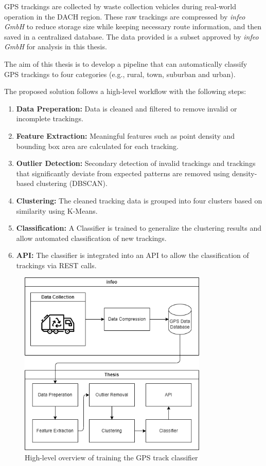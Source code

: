 \documentclass[a4paper,12pt,twoside]{scrreprt}
\begin{document}
GPS trackings are collected by waste collection vehicles during real-world
operation in the DACH region.
These raw trackings are compressed by \textit{infeo GmbH} to reduce storage
size while
keeping necessary route information, and then saved in a centralized database.
The data provided is a subset approved by \textit{infeo GmbH} for analysis in
this thesis.

The aim of this thesis is to develop a pipeline that can automatically classify
GPS trackings to four categories (e.g., rural, town, suburban and urban).

The proposed solution follows a high-level workflow with the following steps:

\begin{enumerate}
  \item \textbf{Data Preperation:} Data is cleaned and filtered to remove
        invalid or incomplete trackings.
  \item \textbf{Feature Extraction:} Meaningful features such as point density
        and bounding box area are calculated for each tracking.
  \item \textbf{Outlier Detection:} Secondary detection of invalid trackings
        and trackings that significantly deviate from expected patterns are
        removed
        using density-based clustering (DBSCAN).
  \item \textbf{Clustering:} The cleaned tracking data is grouped into four
        clusters based on similarity using K-Means.
  \item \textbf{Classification:} A Classifier is trained to generalize the
        clustering results and allow automated classification of new trackings.
  \item \textbf{API:} The classifier is integrated into an API to allow the
        classification of trackings via REST calls.
\end{enumerate}

\begin{figure}[htbp]
  \centering

  \includegraphics[width=0.8\textwidth]{Diagrams/drawio/big_picture.png}
  \caption{High-level overview of training the GPS track classifier}
  \label{fig:big_picture_diagram}
\end{figure}
\FloatBarrier
\end{document}
